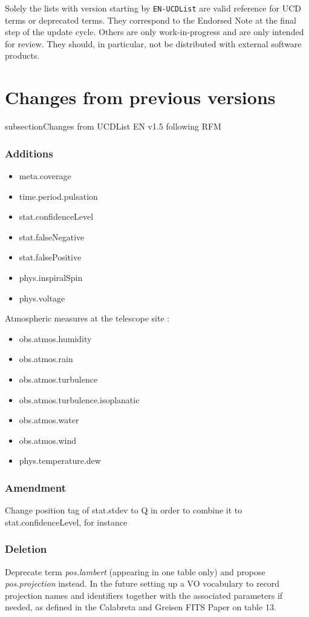\documentclass[11pt,a4paper]{ivoa}
\begin{document}
Solely the lists with version starting by \texttt{EN-UCDList} are valid reference for UCD 
terms or deprecated terms. They correspond to the Endorsed Note at the final step of the 
update cycle. Others are only work-in-progress and are only intended
for review.   They should, in particular, not be distributed with
external software products.

\section{Changes from previous versions}
subsection{Changes from UCDList EN v1.5 following RFM}
\subsubsection*{Additions}
\begin{itemize}
\item meta.coverage
\item time.period.pulsation
\item stat.confidenceLevel 
\item stat.falseNegative
\item stat.falsePositive
\item phys.inspiralSpin
\item phys.voltage
\end{itemize}
Atmospheric measures at the telescope site :
\begin{itemize}
\item obs.atmos.humidity
\item obs.atmos.rain
\item obs.atmos.turbulence 
\item obs.atmos.turbulence.isoplanatic
\item obs.atmos.water
\item obs.atmos.wind
\item phys.temperature.dew
\end{itemize}

\subsubsection*{Amendment}
Change position tag of stat.stdev to Q in order to combine it to stat.confidenceLevel, for instance  

\subsubsection*{Deletion}
Deprecate term \emph{pos.lambert} (appearing in one table only) and propose \emph{pos.projection} instead.
In the future  setting up a VO vocabulary to record  projection names and identifiers together with the associated 
parameters if needed, as defined in the Calabreta  and Greisen FITS Paper  \citep{2002A&A...395.1077C} on table 13.
\end{document}
